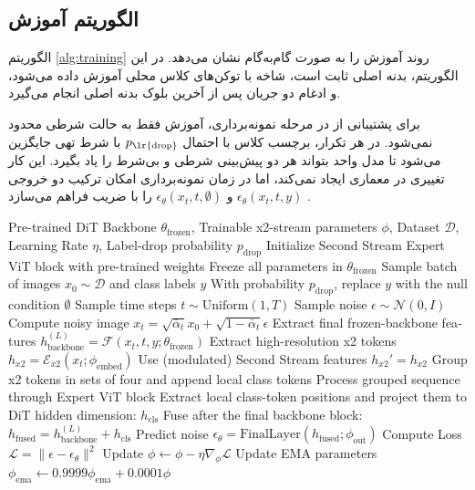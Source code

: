 \subsection{الگوریتم آموزش}
الگوریتم \ref{alg:training} روند آموزش  را به صورت گام‌به‌گام نشان می‌دهد. در این الگوریتم، بدنه اصلی  ثابت است، شاخه  با توکن‌های کلاس محلی آموزش داده می‌شود، و ادغام دو جریان پس از آخرین بلوک بدنه اصلی انجام می‌گیرد.

برای پشتیبانی از  در مرحله نمونه‌برداری، آموزش فقط به حالت شرطی محدود نمی‌شود. در هر تکرار، برچسب کلاس با احتمال $p_{\text{\lr{drop}}}$ با شرط تهی جایگزین می‌شود تا مدل واحد بتواند هر دو پیش‌بینی شرطی و بی‌شرط را یاد بگیرد. این کار تغییری در معماری  ایجاد نمی‌کند، اما در زمان نمونه‌برداری امکان ترکیب دو خروجی
$\epsilon_\theta(x_t,t,y)$
و
$\epsilon_\theta(x_t,t,\emptyset)$
را با ضریب  فراهم می‌سازد \cite{ho2022classifierFreeGuidance}.

\begin{latin}
\begin{algorithm}[htbp]
\caption{Parameter-Efficient Training Loop for DuoDiT}
\label{alg:training}
\begin{algorithmic}[1]
\Require Pre-trained DiT Backbone $\theta_{\text{frozen}}$, Trainable x2-stream parameters $\phi$, Dataset $\mathcal{D}$, Learning Rate $\eta$, Label-drop probability $p_{\text{drop}}$
\State Initialize Second Stream Expert ViT block with pre-trained weights
\State Freeze all parameters in $\theta_{\text{frozen}}$
    \State Sample batch of images $x_0 \sim \mathcal{D}$ and class labels $y$
    \State With probability $p_{\text{drop}}$, replace $y$ with the null condition $\emptyset$
    \State Sample time steps $t \sim \text{Uniform}(1, T)$
    \State Sample noise $\epsilon \sim \mathcal{N}(0, I)$
    \State Compute noisy image $x_t = \sqrt{\bar{\alpha}_t}x_0 + \sqrt{1 - \bar{\alpha}_t}\epsilon$
    \State Extract final frozen-backbone features $h_{\text{backbone}}^{(L)} = \mathcal{F}(x_t, t, y; \theta_{\text{frozen}})$
    \State Extract high-resolution x2 tokens $h_{x2} = \mathcal{E}_{x2}(x_t; \phi_{\text{embed}})$
    \State Use (modulated) Second Stream features $h_{x2}' = h_{x2}$
    \State Group x2 tokens in sets of four and append local class tokens
    \State Process grouped sequence through Expert ViT block
    \State Extract local class-token positions and project them to DiT hidden dimension: $h_{\text{cls}}$
    \State Fuse after the final backbone block: $h_{\text{fused}} = h_{\text{backbone}}^{(L)} + h_{\text{cls}}$
    \State Predict noise $\epsilon_\theta = \text{FinalLayer}(h_{\text{fused}}; \phi_{\text{out}})$
    \State Compute Loss $\mathcal{L} = \| \epsilon - \epsilon_\theta \|^2$
    \State Update $\phi \gets \phi - \eta \nabla_\phi \mathcal{L}$
    \State Update EMA parameters $\phi_{\text{ema}} \gets 0.9999 \phi_{\text{ema}} + 0.0001 \phi$
\EndWhile
\end{algorithmic}
\end{algorithm}
\end{latin}


